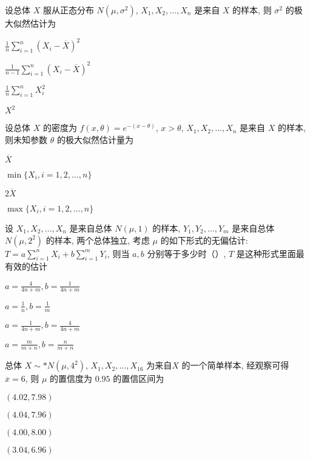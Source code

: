 \documentclass{exam-zh}
\begin{document}
\begin{question}
  设总体 $X$ 服从正态分布 $N(\mu, \sigma^2)$, $X_1, X_2, \dots, X_n$ 是来自 $X$ 的样本, 则 $\sigma^2$ 的极大似然估计为\paren[A]
  
  \begin{choices}
    \item $\frac{1}{n}\sum_{i=1}^{n}(X_i - \overline{X})^2$
    \item $\frac{1}{n-1}\sum_{i=1}^{n}(X_i - \overline{X})^2$
    \item $\frac{1}{n}\sum_{i=1}^{n}X_i^2$
    \item $X^2$
  \end{choices}
\end{question}

\begin{question}
  设总体 $X$ 的密度为 $f(x, \theta) = e^{-(x - \theta)}$, $x > \theta$, $X_1, X_2, \dots, X_n$ 是来自 $X$ 的样本, 则未知参数 $\theta$ 的极大似然估计量为\paren[B]
  
  \begin{choices}
    \item $\overline{X}$
    \item $\min\{X_i, i = 1, 2, \dots, n\}$
    \item $2\overline{X}$
    \item $\max\{X_i, i = 1, 2, \dots, n\}$
  \end{choices}
\end{question}

\begin{question}
  设 $X_1, X_2, \dots, X_n$ 是来自总体 $N(\mu, 1)$ 的样本, $Y_1, Y_2, \dots, Y_m$ 是来自总体 $N(\mu, 2^2)$ 的样本, 两个总体独立, 考虑 $\mu$ 的如下形式的无偏估计: $T = a\sum_{i=1}^{n}X_i + b\sum_{i=1}^{m}Y_i$, 则当 $a, b$ 分别等于多少时（\quad ）, $T$ 是这种形式里面最有效的估计 \paren[A]
  
  \begin{choices}
    \item $a = \frac{4}{4n + m}, b = \frac{1}{4n + m}$
    \item $a = \frac{1}{n}, b = \frac{1}{m}$
    \item $a = \frac{1}{4n + m}, b = \frac{4}{4n + m}$
    \item $a = \frac{m}{m + n}, b = \frac{n}{m + n}$
  \end{choices}
\end{question}

\begin{question}
  总体 $X \sim* N(\mu, 4^2)$, $X_1, X_2, \dots, X_{16}$ 为来自$X$ 的一个简单样本, 经观察可得 $\overline{x} = 6$, 则 $\mu$ 的置信度为 $0.95$ 的置信区间为 \paren[B]
  
  \begin{choices}
    \item $(4.02, 7.98)$
    \item $(4.04, 7.96)$
    \item $(4.00, 8.00)$
    \item $(3.04, 6.96)$
  \end{choices}
\end{question}
\end{document}
